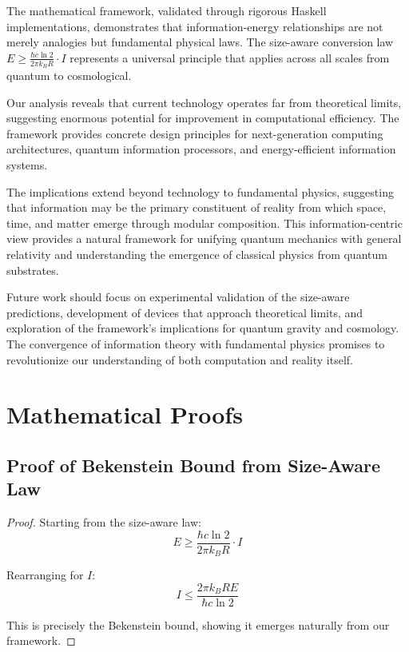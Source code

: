 \documentclass[11pt,a4paper]{article}
\theoremstyle{definition}
\begin{document}
The mathematical framework, validated through rigorous Haskell implementations, demonstrates that information-energy relationships are not merely analogies but fundamental physical laws. The size-aware conversion law $E \geq \frac{\hbar c \ln 2}{2\pi k_B R} \cdot I$ represents a universal principle that applies across all scales from quantum to cosmological.

Our analysis reveals that current technology operates far from theoretical limits, suggesting enormous potential for improvement in computational efficiency. The framework provides concrete design principles for next-generation computing architectures, quantum information processors, and energy-efficient information systems.

The implications extend beyond technology to fundamental physics, suggesting that information may be the primary constituent of reality from which space, time, and matter emerge through modular composition. This information-centric view provides a natural framework for unifying quantum mechanics with general relativity and understanding the emergence of classical physics from quantum substrates.

Future work should focus on experimental validation of the size-aware predictions, development of devices that approach theoretical limits, and exploration of the framework's implications for quantum gravity and cosmology. The convergence of information theory with fundamental physics promises to revolutionize our understanding of both computation and reality itself.

\appendix

\section{Mathematical Proofs}

\subsection{Proof of Bekenstein Bound from Size-Aware Law}

\begin{proof}
Starting from the size-aware law:
\begin{equation}
E \geq \frac{\hbar c \ln 2}{2\pi k_B R} \cdot I
\end{equation}

Rearranging for $I$:
\begin{equation}
I \leq \frac{2\pi k_B R E}{\hbar c \ln 2}
\end{equation}

This is precisely the Bekenstein bound, showing it emerges naturally from our framework.
\end{proof}
\end{document}
